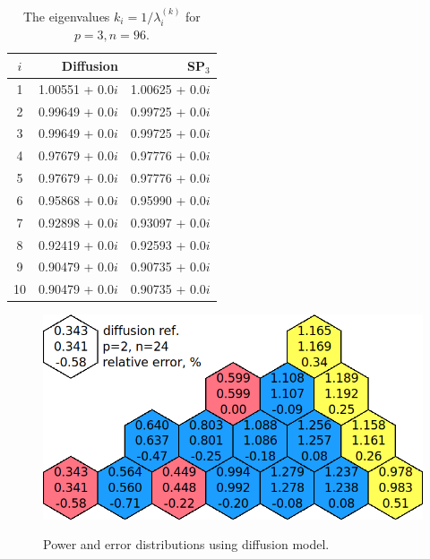 \documentclass[authoryear]{elsarticle}
\begin{document}
\begin{table}[h]
\caption{The eigenvalues $k_i=1/\lambda_i^{(k)}$ for $p=3, n=96$.}
\label{tab:iaea_with_lambda_10}
\begin{center}
\begin{tabular}{c r r}
\hline
$i$ & Diffusion & SP$_3$  \\
\hline
1 & 1.00551 + 0.0$i$ & 1.00625 + 0.0$i$\\
2 & 0.99649 + 0.0$i$ & 0.99725 + 0.0$i$\\
3 & 0.99649 + 0.0$i$ & 0.99725 + 0.0$i$\\
4 & 0.97679 + 0.0$i$ & 0.97776 + 0.0$i$\\
5 & 0.97679 + 0.0$i$ & 0.97776 + 0.0$i$\\
6 & 0.95868 + 0.0$i$ & 0.95990 + 0.0$i$\\
7 & 0.92898 + 0.0$i$ & 0.93097 + 0.0$i$\\
8 & 0.92419 + 0.0$i$ & 0.92593 + 0.0$i$\\
9 & 0.90479 + 0.0$i$ & 0.90735 + 0.0$i$\\
10 & 0.90479 + 0.0$i$ & 0.90735 + 0.0$i$\\
\hline
\end{tabular}
\end{center}
\end{table}

\begin{figure}[h]
\begin{center}
	\includegraphics[width=0.85\linewidth]{diff_p2n24.png}\\
	\caption{Power and error distributions using diffusion model.}
	\label{ris:power1}
\end{center}
\end{figure}
\end{document}
